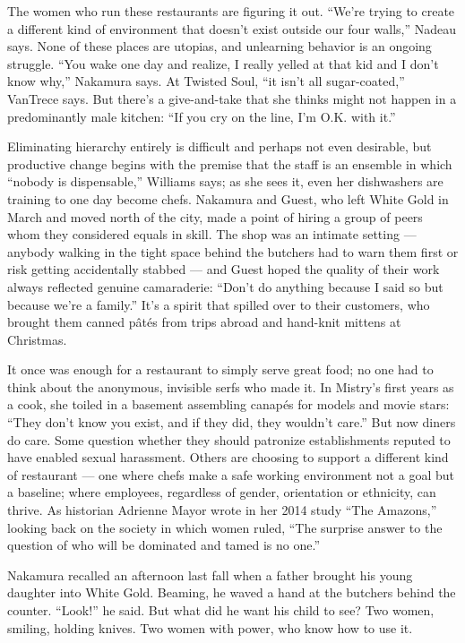 The women who run these restaurants are figuring it out. ``We're trying
to create a different kind of environment that doesn't exist outside our
four walls,'' Nadeau says. None of these places are utopias, and
unlearning behavior is an ongoing struggle. ``You wake one day and
realize, I really yelled at that kid and I don't know why,'' Nakamura
says. At Twisted Soul, ``it isn't all sugar-coated,'' VanTrece says. But
there's a give-and-take that she thinks might not happen in a
predominantly male kitchen: ``If you cry on the line, I'm O.K. with
it.''

Eliminating hierarchy entirely is difficult and perhaps not even
desirable, but productive change begins with the premise that the staff
is an ensemble in which ``nobody is dispensable,'' Williams says; as she
sees it, even her dishwashers are training to one day become chefs.
Nakamura and Guest, who left White Gold in March and moved north of the
city, made a point of hiring a group of peers whom they considered
equals in skill. The shop was an intimate setting --- anybody walking in
the tight space behind the butchers had to warn them first or risk
getting accidentally stabbed --- and Guest hoped the quality of their
work always reflected genuine camaraderie: ``Don't do anything because I
said so but because we're a family.'' It's a spirit that spilled over to
their customers, who brought them canned pâtés from trips abroad and
hand-knit mittens at Christmas.

It once was enough for a restaurant to simply serve great food; no one
had to think about the anonymous, invisible serfs who made it. In
Mistry's first years as a cook, she toiled in a basement assembling
canapés for models and movie stars: ``They don't know you exist, and if
they did, they wouldn't care.'' But now diners do care. Some question
whether they should patronize establishments reputed to have enabled
sexual harassment. Others are choosing to support a different kind of
restaurant --- one where chefs make a safe working environment not a
goal but a baseline; where employees, regardless of gender, orientation
or ethnicity, can thrive. As historian Adrienne Mayor wrote in her 2014
study ``The Amazons,'' looking back on the society in which women ruled,
``The surprise answer to the question of who will be dominated and tamed
is no one.''

Nakamura recalled an afternoon last fall when a father brought his young
daughter into White Gold. Beaming, he waved a hand at the butchers
behind the counter. ``Look!'' he said. But what did he want his child to
see? Two women, smiling, holding knives. Two women with power, who know
how to use it.

